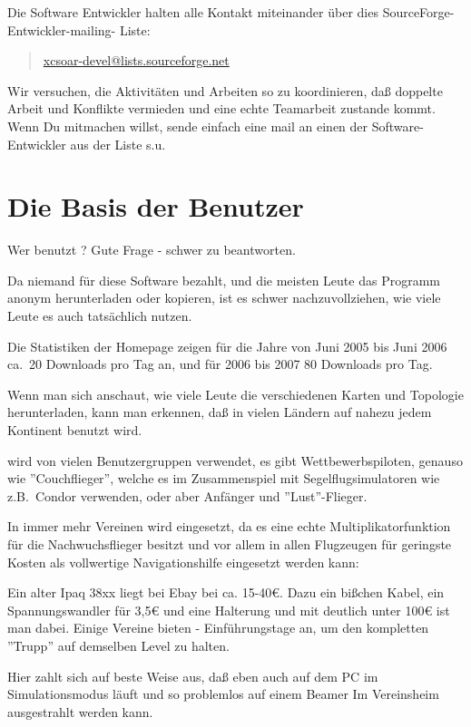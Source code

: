 Die Software Entwickler halten alle Kontakt miteinander über dies SourceForge-Entwickler-mailing- Liste:
\begin{quote}
\url{xcsoar-devel@lists.sourceforge.net}
\end{quote}
Wir versuchen, die Aktivitäten und Arbeiten so zu koordinieren, daß doppelte Arbeit und Konflikte vermieden
und eine echte Teamarbeit zustande kommt. 
Wenn Du mitmachen willst, sende einfach eine mail an einen der Software-Entwickler aus der Liste s.u.\

\section{Die Basis der Benutzer}

Wer benutzt \xc? Gute Frage - schwer zu beantworten.

Da niemand für diese Software bezahlt, und die meisten Leute das Programm
anonym herunterladen oder kopieren, ist es schwer nachzuvollziehen,  wie viele Leute es auch tatsächlich nutzen.

Die Statistiken der Homepage zeigen für die Jahre von Juni 2005 bis Juni 2006 ca.\ 20 Downloads pro Tag an, und für 2006 bis 2007
80 Downloads pro Tag.

Wenn man sich anschaut, wie viele Leute die verschiedenen Karten und Topologie  herunterladen, kann man erkennen, daß
\xc in vielen Ländern auf nahezu jedem Kontinent benutzt wird.

\xc wird von vielen Benutzergruppen verwendet, es gibt Wettbewerbspiloten, genauso wie ''Couchflieger'',
welche es im Zusammenspiel mit Segelflugsimulatoren wie z.B.\ Condor verwenden, oder aber Anfänger und ''Lust''-Flieger.

In immer mehr Vereinen wird \xc eingesetzt, da es eine echte Multiplikatorfunktion für die Nachwuchsflieger besitzt  und vor allem
in allen Flugzeugen für geringste Kosten als vollwertige Navigationshilfe eingesetzt werden kann:


Ein alter Ipaq 38xx liegt bei Ebay bei ca. 15-40\euro{}. Dazu ein bißchen Kabel, ein Spannungswandler für 3,5\euro{} und eine Halterung
und mit deutlich unter 100\euro{} ist man dabei.
Einige Vereine bieten \xc - Einführungstage an, um den kompletten ''Trupp'' auf demselben Level zu halten.

Hier zahlt sich auf beste Weise aus, daß \xc eben auch auf dem PC im Simulationsmodus läuft und so problemlos auf einem Beamer Im Vereinsheim
ausgestrahlt werden kann.

